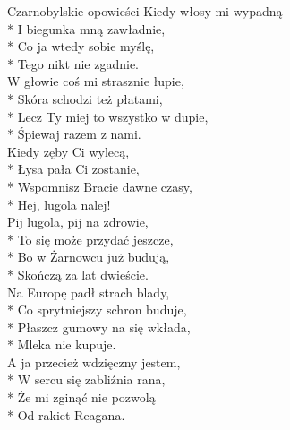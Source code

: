 \begin{piosenka_dluga}{Czarnobylskie opowieści}
Kiedy włosy mi wypadną \\*
I biegunka mną zawładnie, \\*
Co ja wtedy sobie myślę, \\*
Tego nikt nie zgadnie. \\[\zwrotkaspace]

W głowie coś mi strasznie łupie, \\*
Skóra schodzi też płatami, \\*
Lecz Ty miej to wszystko w dupie, \\*
Śpiewaj razem z nami. \\[\zwrotkaspace]

Kiedy zęby Ci wylecą,  \\*
Łysa pała Ci zostanie, \\*
Wspomnisz Bracie dawne czasy, \\*
Hej, lugola nalej! \\[\zwrotkaspace]

Pij lugola, pij na zdrowie, \\*
To się może przydać jeszcze, \\*
Bo w Żarnowcu już budują, \\*
Skończą za lat dwieście. \\[\zwrotkaspace]

Na Europę padł strach blady,  \\*
Co sprytniejszy schron buduje, \\*
Płaszcz gumowy na się wkłada, \\*
Mleka nie kupuje. \\[\zwrotkaspace]

A ja przecież wdzięczny jestem, \\*
W sercu się zabliźnia rana, \\*
Że mi zginąć nie pozwolą \\*
Od rakiet Reagana. \\

\end{piosenka_dluga}